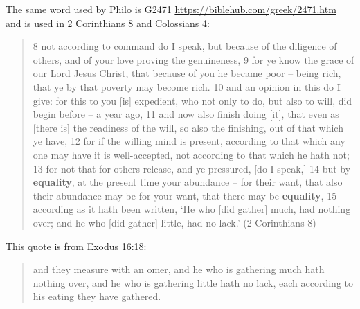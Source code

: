 \documentclass[11pt]{article}
\begin{document}
\noindent\noindent The same word used by Philo is G2471 \url{https://biblehub.com/greek/2471.htm} and is used in 2 Corinthians 8 and Colossians 4:
\begin{quote}
8 not according to command do I speak, but because of the diligence of others, and of your love proving the genuineness, 9 for ye know the grace of our Lord Jesus Christ, that because of you he became poor -- being rich, that ye by that poverty may become rich. 10 and an opinion in this do I give: for this to you [is] expedient, who not only to do, but also to will, did begin before -- a year ago, 11 and now also finish doing [it], that even as [there is] the readiness of the will, so also the finishing, out of that which ye have, 12 for if the willing mind is present, according to that which any one may have it is well-accepted, not according to that which he hath not; 13 for not that for others release, and ye pressured, [do I speak,] 14 but by \textbf{equality}, at the present time your abundance -- for their want, that also their abundance may be for your want, that there may be \textbf{equality}, 15 according as it hath been written, `He who [did gather] much, had nothing over; and he who [did gather] little, had no lack.'
(2 Corinthians 8)
\end{quote}

\noindent\noindent This quote is from Exodus 16:18:
\begin{quote}
and they measure with an omer, and he who is gathering much hath nothing over, and he who is gathering little hath no lack, each according to his eating they have gathered.
\end{quote}
\end{document}
